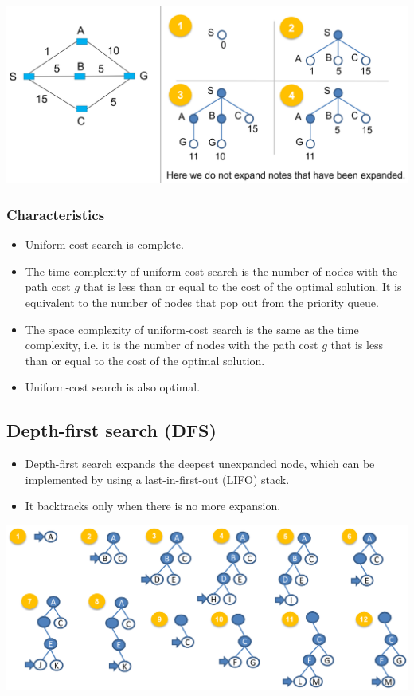 \documentclass[11pt]{article}
\begin{document}
\begin{center}
\includegraphics[width=.9\linewidth]{./images/uniform-cost-search-diagram.png}
\end{center}
\subsubsection{Characteristics}
\label{sec:org977f3e7}
\begin{itemize}
\item Uniform-cost search is complete.
\item The time complexity of uniform-cost search is the number of nodes with the path cost \(g\) that is less than or equal to the cost of the optimal solution. It is equivalent to the number of nodes that pop out from the priority queue.
\item The space complexity of uniform-cost search is the same as the time complexity, i.e. it is the number of nodes with the path cost \(g\) that is less than or equal to the cost of the optimal solution.
\item Uniform-cost search is also optimal.
\end{itemize}

 \newpage
\subsection{Depth-first search (DFS)}
\label{sec:org97e6177}
\begin{itemize}
\item Depth-first search expands the deepest unexpanded node, which can be implemented by using a last-in-first-out (LIFO) stack.
\item It backtracks only when there is no more expansion.
\end{itemize}

\begin{center}
\includegraphics[width=.9\linewidth]{./images/depth-first-search-diagram.png}
\end{center}
\end{document}
